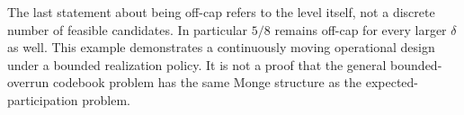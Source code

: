 The last statement about being off-cap refers to the level itself, not a discrete number of feasible candidates. In particular $5/8$ remains off-cap for every larger $\delta$ as well. This example demonstrates a continuously moving operational design under a bounded realization policy. It is not a proof that the general bounded-overrun codebook problem has the same Monge structure as the expected-participation problem.
